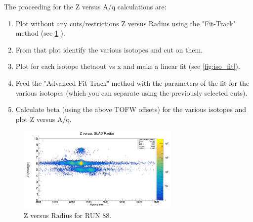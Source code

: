 \documentclass[12pt, letterpaper]{article}
\begin{document}
The proceeding for the Z versus A/q calculations are:
\begin{enumerate}
\item Plot without any cuts/restrictions Z versus Radius using the "Fit-Track" method (see \ref{fig:isotopes} ).
\item From that plot identify the various isotopes and cut on them. 
\item Plot for each isotope theta\textunderscore out vs x and make a linear fit (see \ref{fig:iso_fit}).
\item Feed the "Advanced Fit-Track" method with the parameters of the fit for the various isotopes (which you can separate using the previously selected cuts).
\item Calculate beta (using the above TOFW offsets) for the various isotopes and plot Z versus A/q. 
\\ 
\end{enumerate}
\begin{figure}[!htb]
	\centering
	\includegraphics[width=0.7\textwidth]{isotope_separation.png}
	\caption{Z versus Radius for RUN 88.}
	\label{fig:isotopes}
\end{figure}
\end{document}
